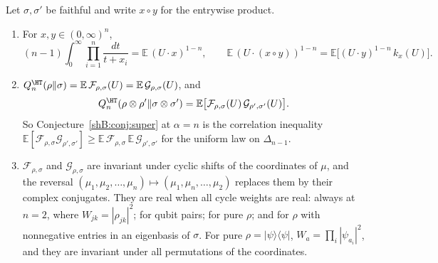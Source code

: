 \begin{proposition}\label{shB:prop:simplex}
Let $\sigma,\sigma'$ be faithful and write $x\circ y$ for the entrywise product.
\begin{enumerate}[label=(\alph*)]
\item For $x,y\in(0,\infty)^n$,
\[
(n-1)\int_0^\infty\prod_{i=1}^n\frac{dt}{t+x_i}=\mathbb E\,(U\cdot x)^{1-n},\qquad \mathbb E\,(U\cdot(x\circ y))^{1-n}=\mathbb E\big[(U\cdot y)^{1-n}\,k_x(U)\big].
\]
\item $Q^\HT_n(\rho\|\sigma)=\mathbb E\,\mathcal F_{\rho,\sigma}(U)=\mathbb E\,\mathcal G_{\rho,\sigma}(U)$, and
\[
Q^\HT_n(\rho\otimes\rho'\|\sigma\otimes\sigma')=\mathbb E\big[\mathcal F_{\rho,\sigma}(U)\,\mathcal G_{\rho',\sigma'}(U)\big].
\]
So Conjecture~\ref{shB:conj:super} at $\alpha=n$ is the correlation inequality $\mathbb E[\mathcal F_{\rho,\sigma}\mathcal G_{\rho',\sigma'}]\ge\mathbb E\,\mathcal F_{\rho,\sigma}\,\mathbb E\,\mathcal G_{\rho',\sigma'}$ for the uniform law on $\Delta_{n-1}$.
\item $\mathcal F_{\rho,\sigma}$ and $\mathcal G_{\rho,\sigma}$ are invariant under cyclic shifts of the coordinates of $\mu$, and the reversal $(\mu_1,\mu_2,\dots,\mu_n)\mapsto(\mu_1,\mu_n,\dots,\mu_2)$ replaces them by their complex conjugates. They are real when all cycle weights are real: always at $n=2$, where $W_{jk}=|\rho_{jk}|^2$; for qubit pairs; for pure $\rho$; and for $\rho$ with nonnegative entries in an eigenbasis of $\sigma$. For pure $\rho=|\psi\rangle\langle\psi|$, $W_a=\prod_i|\psi_{a_i}|^2$, and they are invariant under all permutations of the coordinates.
\end{enumerate}
\end{proposition}

